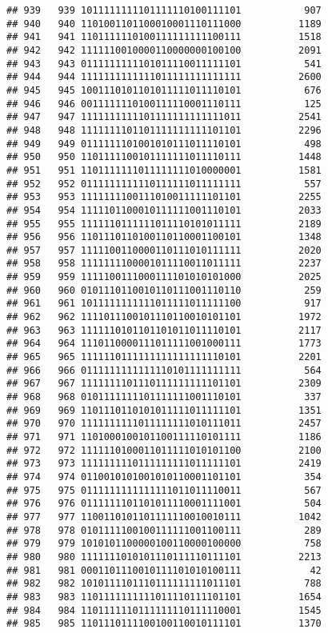 \documentclass[]{article}
\begin{document}
\begin{verbatim}
## 939   939 1011111111101111110100111101           907
## 940   940 1101001101100010001110111000          1189
## 941   941 1101111110100111111111100111          1518
## 942   942 1111110010000110000000100100          2091
## 943   943 0111111111101011110011111101           541
## 944   944 1111111111111011111111111111          2600
## 945   945 1001110101101011111011110101           676
## 946   946 0011111110100111110001110111           125
## 947   947 1111111111101111111111111011          2541
## 948   948 1111111101101111111111101101          2296
## 949   949 0111111101001010111011110101           498
## 950   950 1101111100101111111011110111          1448
## 951   951 1101111111011111111010000001          1581
## 952   952 0111111111110111111011111111           557
## 953   953 1111111100111010011111101101          2255
## 954   954 1111101100010111111001110101          2033
## 955   955 1111110111111011110101011111          2189
## 956   956 1101110110100110110001100101          1348
## 957   957 1111100110000110111010111111          2020
## 958   958 1111111100001011110011011111          2237
## 959   959 1111100111000111101010101000          2025
## 960   960 0101110110010110111001110110           259
## 961   961 1011111111111011111011111100           917
## 962   962 1111011100101110110010101101          1972
## 963   963 1111110101101101011011110101          2117
## 964   964 1110110000111011111001000111          1773
## 965   965 1111110111111111111111110101          2201
## 966   966 0111111111111110101111111111           564
## 967   967 1111111101110111111111101101          2309
## 968   968 0101111111101111111001110101           337
## 969   969 1101110110101011111011111101          1351
## 970   970 1111111111011111111010111011          2457
## 971   971 1101000100101100111110101111          1186
## 972   972 1111110100011011111010101100          2100
## 973   973 1111111110111111111011111101          2419
## 974   974 0110010101001010110001101101           354
## 975   975 0111111111111111011011110011           567
## 976   976 0111111101101011110001111001           504
## 977   977 1100110101101111110010010111          1042
## 978   978 0101111100100111111001100111           289
## 979   979 1010101100000100110000100000           758
## 980   980 1111111010101110111110111101          2213
## 981   981 0001101110010111101010100111            42
## 982   982 1010111101110111111111011101           788
## 983   983 1101111111111011110111101101          1654
## 984   984 1101111110111111110111110001          1545
## 985   985 1101110111100100110010111101          1370

\end{verbatim}
\end{document}
